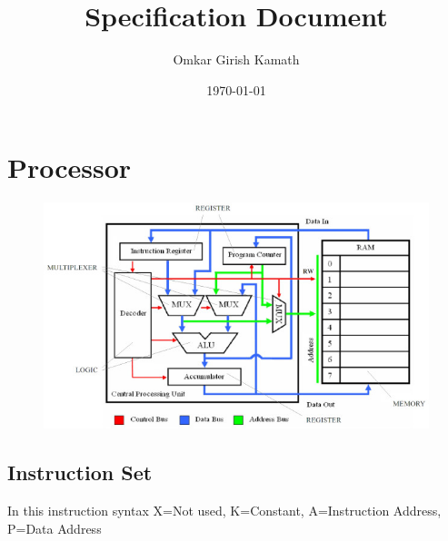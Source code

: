 \documentclass[11pt]{article}
\author{Omkar Girish Kamath}
\date{\today}
\title{Specification Document}
\begin{document}
\maketitle
\tableofcontents
\vspace*{70mm}
\section{Processor}
\begin{figure}
  \begin{center}
    \caption{}
    \includegraphics[scale=0.5]{top_view.jpg}
  \end{center}
\end{figure}
\subsection{Instruction Set}
\label{sec:org4f08230}

In this instruction syntax X=Not used, K=Constant, A=Instruction Address, P=Data Address
\end{document}
